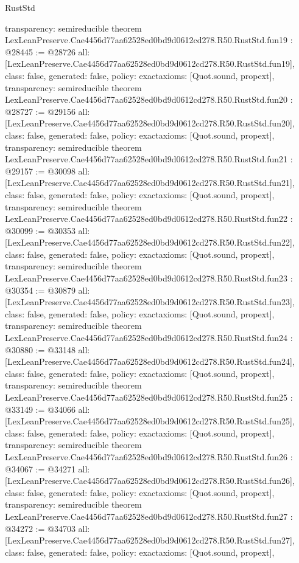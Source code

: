 \begin{lexlean}{RustStd}
\begin{coremodule}
{  transparency: semireducible
}
theorem LexLeanPreserve.Cae4456d77aa62528ed0bd9d0612cd278.R50.RustStd.fun19 : @28445 := @28726 {
  all: [LexLeanPreserve.Cae4456d77aa62528ed0bd9d0612cd278.R50.RustStd.fun19],
  class: false,
  generated: false,
  policy: exact{axioms: [Quot.sound, propext]},
  transparency: semireducible
}
theorem LexLeanPreserve.Cae4456d77aa62528ed0bd9d0612cd278.R50.RustStd.fun20 : @28727 := @29156 {
  all: [LexLeanPreserve.Cae4456d77aa62528ed0bd9d0612cd278.R50.RustStd.fun20],
  class: false,
  generated: false,
  policy: exact{axioms: [Quot.sound, propext]},
  transparency: semireducible
}
theorem LexLeanPreserve.Cae4456d77aa62528ed0bd9d0612cd278.R50.RustStd.fun21 : @29157 := @30098 {
  all: [LexLeanPreserve.Cae4456d77aa62528ed0bd9d0612cd278.R50.RustStd.fun21],
  class: false,
  generated: false,
  policy: exact{axioms: [Quot.sound, propext]},
  transparency: semireducible
}
theorem LexLeanPreserve.Cae4456d77aa62528ed0bd9d0612cd278.R50.RustStd.fun22 : @30099 := @30353 {
  all: [LexLeanPreserve.Cae4456d77aa62528ed0bd9d0612cd278.R50.RustStd.fun22],
  class: false,
  generated: false,
  policy: exact{axioms: [Quot.sound, propext]},
  transparency: semireducible
}
theorem LexLeanPreserve.Cae4456d77aa62528ed0bd9d0612cd278.R50.RustStd.fun23 : @30354 := @30879 {
  all: [LexLeanPreserve.Cae4456d77aa62528ed0bd9d0612cd278.R50.RustStd.fun23],
  class: false,
  generated: false,
  policy: exact{axioms: [Quot.sound, propext]},
  transparency: semireducible
}
theorem LexLeanPreserve.Cae4456d77aa62528ed0bd9d0612cd278.R50.RustStd.fun24 : @30880 := @33148 {
  all: [LexLeanPreserve.Cae4456d77aa62528ed0bd9d0612cd278.R50.RustStd.fun24],
  class: false,
  generated: false,
  policy: exact{axioms: [Quot.sound, propext]},
  transparency: semireducible
}
theorem LexLeanPreserve.Cae4456d77aa62528ed0bd9d0612cd278.R50.RustStd.fun25 : @33149 := @34066 {
  all: [LexLeanPreserve.Cae4456d77aa62528ed0bd9d0612cd278.R50.RustStd.fun25],
  class: false,
  generated: false,
  policy: exact{axioms: [Quot.sound, propext]},
  transparency: semireducible
}
theorem LexLeanPreserve.Cae4456d77aa62528ed0bd9d0612cd278.R50.RustStd.fun26 : @34067 := @34271 {
  all: [LexLeanPreserve.Cae4456d77aa62528ed0bd9d0612cd278.R50.RustStd.fun26],
  class: false,
  generated: false,
  policy: exact{axioms: [Quot.sound, propext]},
  transparency: semireducible
}
theorem LexLeanPreserve.Cae4456d77aa62528ed0bd9d0612cd278.R50.RustStd.fun27 : @34272 := @34703 {
  all: [LexLeanPreserve.Cae4456d77aa62528ed0bd9d0612cd278.R50.RustStd.fun27],
  class: false,
  generated: false,
  policy: exact{axioms: [Quot.sound, propext]},
}
\end{coremodule}
\end{lexlean}
